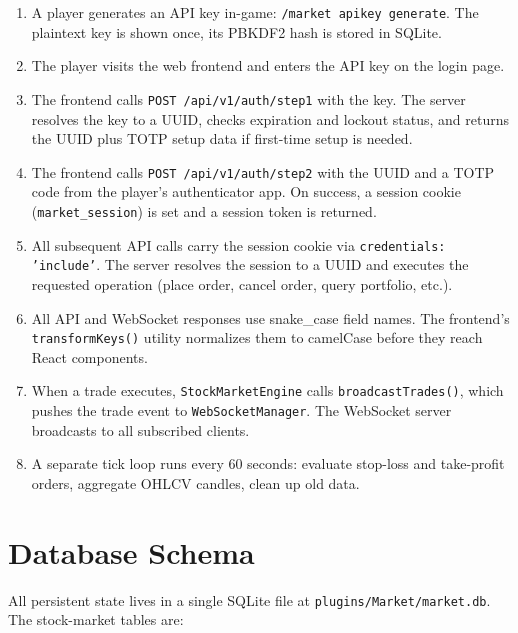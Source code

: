\documentclass[12pt,a4paper]{report}
\begin{document}
\begin{enumerate}
\item A player generates an API key in-game: \texttt{/market apikey generate}.
  The plaintext key is shown once, its PBKDF2 hash is stored in SQLite.
 \item The player visits the web frontend and enters the API key on the login page.
\item The frontend calls \texttt{POST /api/v1/auth/step1} with the key. The
  server resolves the key to a UUID, checks expiration and lockout status,
  and returns the UUID plus TOTP setup data if first-time setup is needed.
\item The frontend calls \texttt{POST /api/v1/auth/step2} with the UUID
  and a TOTP code from the player's authenticator app. On success, a session
  cookie (\texttt{market\_session}) is set and a session token is returned.
\item All subsequent API calls carry the session cookie via
  \texttt{credentials: 'include'}. The server resolves the session to a UUID
  and executes the requested operation (place order, cancel order, query
  portfolio, etc.).
\item All API and WebSocket responses use snake\_case field names. The
  frontend's \texttt{transformKeys()} utility normalizes them to camelCase
  before they reach React components.
\item When a trade executes, \texttt{StockMarketEngine} calls
  \texttt{broadcastTrades()}, which pushes the trade event to
  \texttt{WebSocketManager}. The WebSocket server broadcasts to all
  subscribed clients.
\item A separate tick loop runs every 60 seconds: evaluate stop-loss and
  take-profit orders, aggregate OHLCV candles, clean up old data.
\end{enumerate}

\section{Database Schema}

All persistent state lives in a single SQLite file at
\texttt{plugins/Market/market.db}. The stock-market tables are:
\end{document}
